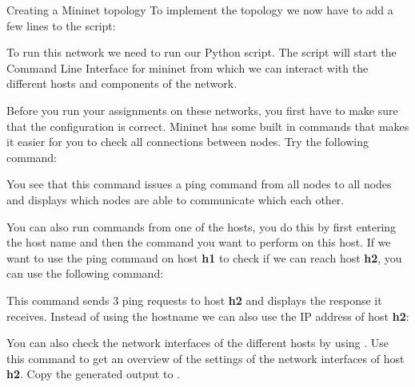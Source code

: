 \begin{exercise}{Creating a Mininet topology}
To implement the topology we now have to add a few lines to the  script:



To run this network we need to run our Python script. The script will start the Command Line Interface for mininet from which we can interact with the different hosts and components of the network.

Before you run your assignments on these networks, you first have to make sure that the configuration is correct. Mininet has some built in commands that makes it easier for you to check all connections between nodes. Try the following command:
\begin{cmdblock}[gobble=2]
\end{cmdblock}
You see that this command issues a ping command from all nodes to all nodes and displays which nodes are able to communicate which each other.

You can also run commands from one of the hosts, you do this by first entering the host name and then the command you want to perform on this host. If we want to use the ping command on host \textbf{h1} to check if we can reach host \textbf{h2}, you can use the following command:
\begin{cmdblock}[gobble=2]
\end{cmdblock}
This command sends 3 ping requests to host \textbf{h2} and displays the response it receives. Instead of using the hostname we can also use the IP address of host \textbf{h2}:
\begin{cmdblock}[gobble=2]
\end{cmdblock}

You can also check the network interfaces of the different hosts by using . Use this command to get an overview of the settings of the network interfaces of host \textbf{h2}. Copy the generated output to .
\end{exercise}

